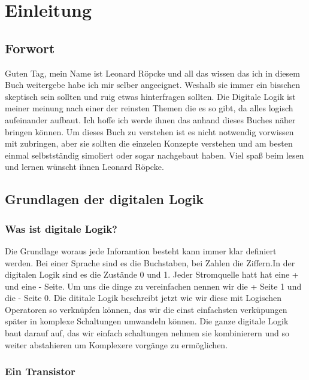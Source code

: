 \chapter{Einleitung}
\section{Forwort}
Guten Tag, mein Name ist Leonard Röpcke und all das wissen das ich in diesem Buch weitergebe habe ich mir selber angeeignet. 
Weshalb sie immer ein bisschen skeptisch sein sollten und ruig etwas hinterfragen sollten.
Die Digitale Logik ist meiner meinung nach einer der reinsten Themen die es so gibt, da alles logisch aufeinander aufbaut.
Ich hoffe ich werde ihnen das anhand dieses Buches näher bringen können.
Um dieses Buch zu verstehen ist es nicht notwendig vorwissen mit zubringen, aber sie sollten die einzelen Konzepte verstehen und am besten
einmal selbstständig simoliert oder sogar nachgebaut haben.
Viel spaß beim lesen und lernen wünscht ihnen Leonard Röpcke.

\section{Grundlagen der digitalen Logik}
\subsection{Was ist digitale Logik?}
Die Grundlage woraus jede Inforamtion besteht kann immer klar definiert werden. Bei einer Sprache sind es die Buchstaben, 
bei Zahlen die Ziffern.In der digitalen Logik sind es die Zustände 0 und 1. Jeder Stromquelle hatt hat eine + und eine - Seite. 
Um uns die dinge zu vereinfachen nennen wir die + Seite 1 und die - Seite 0. Die dititale Logik beschreibt jetzt wie wir diese mit Logischen
Operatoren so verknüpfen können, das wir die einst einfachsten verküpungen später in komplexe Schaltungen umwandeln können.
Die ganze digitale Logik baut darauf auf, das wir einfach schaltungen nehmen sie kombinierern und so weiter abstahieren um Komplexere vorgänge zu ermöglichen.

\subsection{Ein Transistor}

